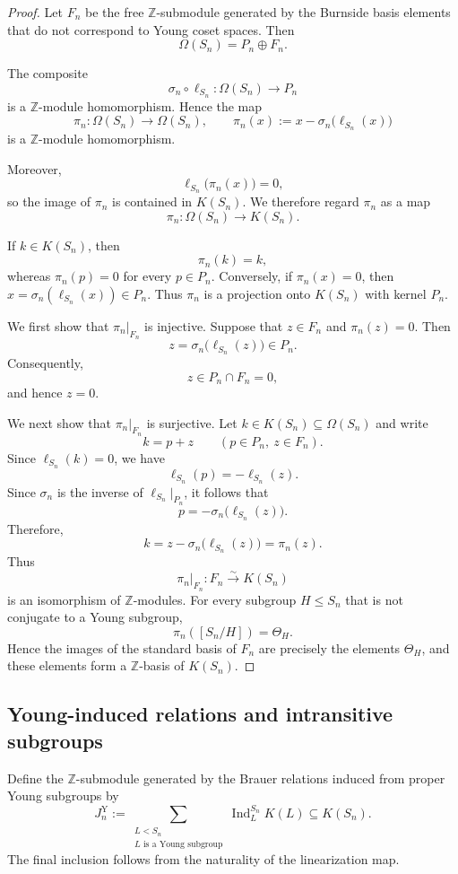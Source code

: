 \documentclass[a4paper,11pt]{article}
\numberwithin{equation}{section}
\newcommand{\Z}{\mathbb{Z}}
\newcommand{\Ind}{\operatorname{Ind}}
\begin{document}
\begin{proof}
Let $F_n$ be the free $\Z$-submodule generated by the Burnside basis elements
that do not correspond to Young coset spaces. Then
\[
  \Omega(S_n)=P_n\oplus F_n.
\]

The composite
\[
  \sigma_n\circ\ell_{S_n}:
  \Omega(S_n)\longrightarrow P_n
\]
is a $\Z$-module homomorphism. Hence the map
\[
  \pi_n:\Omega(S_n)\longrightarrow\Omega(S_n),
  \qquad
  \pi_n(x)
  :=
  x-\sigma_n\bigl(\ell_{S_n}(x)\bigr)
\]
is a $\Z$-module homomorphism.

Moreover,
\[
  \ell_{S_n}\bigl(\pi_n(x)\bigr)=0,
\]
so the image of $\pi_n$ is contained in $K(S_n)$. We therefore regard $\pi_n$
as a map
\[
  \pi_n:\Omega(S_n)\longrightarrow K(S_n).
\]

If $k\in K(S_n)$, then
\[
  \pi_n(k)=k,
\]
whereas $\pi_n(p)=0$ for every $p\in P_n$. Conversely, if $\pi_n(x)=0$, then
$x=\sigma_n(\ell_{S_n}(x))\in P_n$. Thus $\pi_n$ is a projection onto
$K(S_n)$ with kernel $P_n$.

We first show that $\pi_n|_{F_n}$ is injective. Suppose that $z\in F_n$ and
$\pi_n(z)=0$. Then
\[
  z=\sigma_n\bigl(\ell_{S_n}(z)\bigr)\in P_n.
\]
Consequently,
\[
  z\in P_n\cap F_n=0,
\]
and hence $z=0$.

We next show that $\pi_n|_{F_n}$ is surjective. Let
$k\in K(S_n)\subseteq\Omega(S_n)$ and write
\[
  k=p+z
  \qquad
  (p\in P_n,\ z\in F_n).
\]
Since $\ell_{S_n}(k)=0$, we have
\[
  \ell_{S_n}(p)=-\ell_{S_n}(z).
\]
Since $\sigma_n$ is the inverse of $\ell_{S_n}|_{P_n}$, it follows that
\[
  p=-\sigma_n\bigl(\ell_{S_n}(z)\bigr).
\]
Therefore,
\[
  k=z-\sigma_n\bigl(\ell_{S_n}(z)\bigr)=\pi_n(z).
\]
Thus
\[
  \pi_n|_{F_n}:F_n\xrightarrow{\sim}K(S_n)
\]
is an isomorphism of $\Z$-modules. For every subgroup $H\le S_n$ that is not
conjugate to a Young subgroup,
\[
  \pi_n([S_n/H])=\Theta_H.
\]
Hence the images of the standard basis of $F_n$ are precisely the elements
$\Theta_H$, and these elements form a $\Z$-basis of $K(S_n)$.
\end{proof}

\subsection{Young-induced relations and intransitive subgroups}
\label{subsec:young-induced-relations}

Define the $\Z$-submodule generated by the Brauer relations induced from proper
Young subgroups by
\begin{equation}\label{eq:young-induced-lattice}
  J_n^{\mathrm Y}
  :=
  \sum_{\substack{L<S_n\\ L\text{ is a Young subgroup}}}
  \Ind_L^{S_n}K(L)
  \subseteq K(S_n).
\end{equation}
The final inclusion follows from the naturality of the linearization map.
\end{document}
